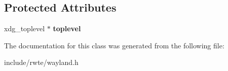 \subsection*{Protected Attributes}
\begin{DoxyCompactItemize}
\item 
\mbox{\label{classwayland_1_1XdgToplevel_adb4e6aa80ebb275e6cd6e9b4176356c7}} 
xdg\+\_\+toplevel $\ast$ {\bfseries toplevel}
\end{DoxyCompactItemize}


The documentation for this class was generated from the following file\+:\begin{DoxyCompactItemize}
\item 
include/rwte/wayland.\+h\end{DoxyCompactItemize}
